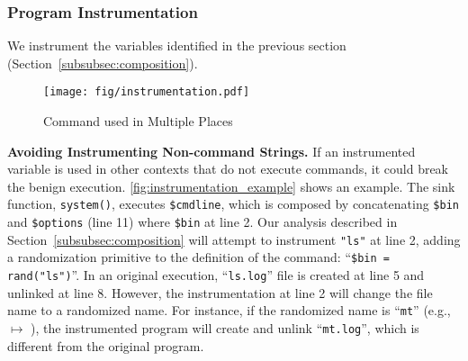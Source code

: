 \subsubsection{Program Instrumentation}
\label{subsubsec:instrumenation}
We instrument the variables identified in the previous section (Section~\ref{subsubsec:composition}).
%

\begin{figure}[ht]
    \centering
    \texttt{[image: fig/instrumentation.pdf]}
    \vspace{-2em}
     \caption{Command used in Multiple Places}
     \vspace{-1em}
     \label{fig:instrumentation_example}
\end{figure}


\noindent
{\bf Avoiding Instrumenting Non-command Strings.}  
If an instrumented variable is used in other contexts that do not execute commands, it could break the benign execution.
\autoref{fig:instrumentation_example} shows an example. The sink function, {\tt system()}, executes {\tt \$cmdline}, which is composed by concatenating {\tt \$bin} and {\tt \$options} (line 11) where {\tt \$bin} at line 2. 
%
Our analysis described in Section~\ref{subsubsec:composition} will attempt to instrument {\tt "ls"} at line 2, adding a randomization primitive to the definition of the command: ``{\tt \$bin = rand("ls")}''. 
In an original execution, ``{\tt ls.log}'' file is created at line 5 and unlinked at line 8.
However, the instrumentation at line 2 will change the file name to a randomized name. 
For instance, if the randomized name is ``{\tt mt}''  (e.g.,  $\mapsto$ ), the instrumented program will create and unlink ``{\tt mt.log}'', which is different from the original program. 

